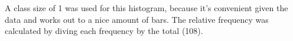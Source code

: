 \documentclass[letterpaper,12pt]{article}
\begin{document}
\begin{enumerate}
\begin{enumerate}
        \begin{center}
        \end{center}
        A class size of 1 was used for this histogram, because it's convenient given the data and works out to a nice amount of bars. The relative frequency was calculated by diving each frequency by the total (108).


\end{enumerate}
\end{enumerate}
\end{document}
